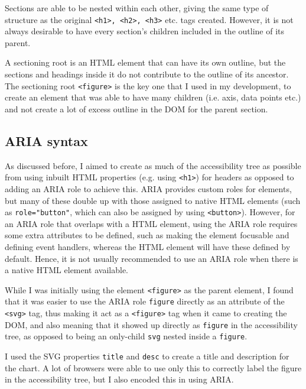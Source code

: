 \documentclass[ %
                    author={Aleena Baig},
                supervisor={Dr Simon Lock},
                    degree={BSc},
                     title={On Making Web Accessible Graphs},
                  subtitle={},
                      year={2019} ]{dissertation}
\begin{document}
Sections are able to be nested within each other, giving the same type of structure as the original \texttt{<h1>, <h2>, <h3>} etc. tags created. However, it is not always desirable to have every section's children included in the outline of its parent.

A sectioning root is an HTML element that can have its own outline, but the sections and headings inside it do not contribute to the outline of its ancestor. The sectioning root \texttt{<figure>} is the key one that I used in my development, to create an element that was able to have many children (i.e. axis, data points etc.) and not create a lot of excess outline in the DOM for the parent section.


\subsection{ARIA syntax}

As discussed before, I aimed to create as much of the accessibility tree as possible from using inbuilt HTML properties (e.g. using \texttt{<h1>}) for headers as opposed to adding an ARIA role to achieve this. ARIA provides custom roles for elements, but many of these double up with those assigned to native HTML elements (such as \texttt{role="button"}, which can also be assigned by using \texttt{<button>}). However, for an ARIA role that overlaps with a HTML element, using the ARIA role requires some extra attributes to be defined, such as making the element focusable and defining event handlers, whereas the HTML element will have these defined by default. Hence, it is not usually recommended to use an ARIA role when there is a native HTML element available.

While I was initially using the element \texttt{<figure>} as the parent element, I found that it was easier to use the ARIA role \texttt{figure} directly as an attribute of the \texttt{<svg>} tag, thus making it act as a \texttt{<figure>} tag when it came to creating the DOM, and also meaning that it showed up directly as \texttt{figure} in the accessibility tree, as opposed to being an only-child \texttt{svg} nested inside a \texttt{figure}.

I used the SVG properties \texttt{title} and \texttt{desc} to create a title and description for the chart. A lot of browsers were able to use only this to correctly label the figure in the accessibility tree, but I also encoded this in using ARIA.
\end{document}
